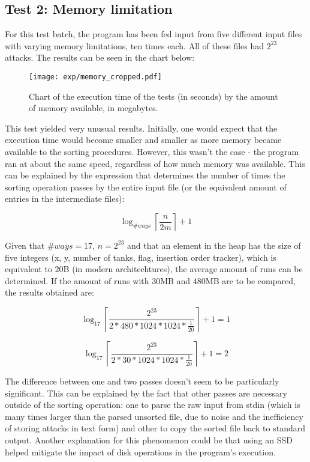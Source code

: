 \documentclass[10pt,a4paper]{article}
\numberwithin{equation}{section}
\begin{document}
\subsection{Test 2: Memory limitation}

For this test batch, the program has been fed input from five different input files with varying memory limitations, ten times each. All of these files had $2^{23}$ attacks. The results can be seen in the chart below:

\begin{figure}[H]
    \centering
    \texttt{[image: exp/memory\_cropped.pdf]}
    \caption{Chart of the execution time of the tests (in seconds) by the amount of memory available, in megabytes.}
    \label{fig:memory}
\end{figure}

This test yielded very unusual results. Initially, one would expect that the execution time would become smaller and smaller as more memory became available to the sorting procedures. However, this wasn't the case - the program ran at about the same speed, regardless of how much memory was available. This can be explained by the expression that determines the number of times the sorting operation passes by the entire input file (or the equivalent amount of entries in the intermediate files):

\begin{equation}
     \log_{\#ways}{\left \lceil\frac{n}{2m}\right \rceil} + 1
\end{equation}

Given that $\#ways = 17$, $n = 2^{23}$ and that an element in the heap has the size of five integers (x, y, number of tanks, flag, insertion order tracker), which is equivalent to $20$B (in modern architechtures), the average amount of runs can be determined. If the amount of runs with $30$MB and $480$MB are to be compared, the results obtained are:
    
\begin{equation}
    \log_{17}{\left \lceil\frac{2^{23}}{2 * 480 * 1024 * 1024 * \frac{1}{20}}\right \rceil} + 1 = 1
\end{equation}

\begin{equation}
    \log_{17}{\left \lceil\frac{2^{23}}{2 * 30 * 1024 * 1024 * \frac{1}{20}}\right \rceil} + 1 = 2
\end{equation}

The difference between one and two passes doesn't seem to be particularly significant. This can be explained by the fact that other passes are necessary outside of the sorting operation: one to parse the raw input from stdin (which is many times larger than the parsed unsorted file, due to noise and the inefficiency of storing attacks in text form) and other to copy the sorted file back to standard output. Another explanation for this phenomenon could be that using an SSD helped mitigate the impact of disk operations in the program's execution. 
\end{document}
